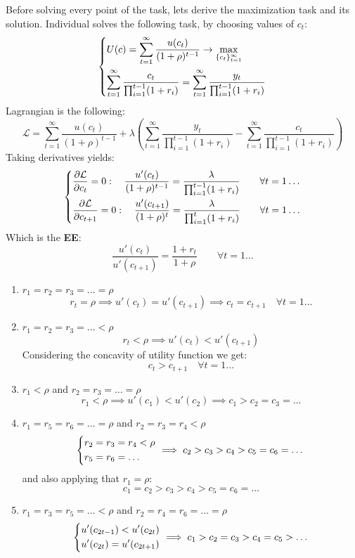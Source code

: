 \documentclass[11pt, oneside]{article}
\renewcommand{\r}{\rho}
\begin{document}
Before solving every point of the task, lets derive the maximization task and its solution. Individual solves the following task, by choosing values of $ c_{t} $:
\[
\begin{dcases}
	U(c) = \sum_{t=1}^{\infty} \frac{u(c_{t})}{(1+\r)^{t-1}} \to \max_{\{c_{t}\}_{t=1}^{\infty}}  \\
	\sum_{t=1}^{\infty}  \frac{c_{t}}{\prod_{i=1}^{t-1} (1+r_{i})} = 	\sum_{t=1}^{\infty}  \frac{y_{t}}{\prod_{i=1}^{t-1} (1+r_{i})}
\end{dcases}
\]
Lagrangian is the following:
\[
	\mathcal{L} = \sum_{t=1}^{\infty} \frac{u(c_{t})}{(1+\r)^{t-1}} + \lambda \left( \sum_{t=1}^{\infty}  \frac{y_{t}}{\prod_{i=1}^{t-1} (1+r_{i})} -  	\sum_{t=1}^{\infty}  \frac{c_{t}}{\prod_{i=1}^{t-1} (1+r_{i})}\right)
\]
Taking derivatives yields:
\[
	\begin{dcases}
		\frac{\partial \mathcal{L}}{\partial c_{t}} = 0: \quad \frac{u'(c_{t})}{(1+\r)^{t-1}} =  \frac{\lambda}{\prod_{i=1}^{t-1} (1+r_{i})} \quad\quad \forall t = 1\dots \\
		\frac{\partial \mathcal{L}}{\partial c_{t+1}} = 0: \quad \frac{u'(c_{t+1})}{(1+\r)^{t}} =  \frac{\lambda}{\prod_{i=1}^{t} (1+r_{i})} \quad\quad \forall t = 1\dots \\
	\end{dcases}
\]
Which is the \textbf{EE}:
\[
	 \frac{u'(c_{t})}{u'(c_{t+1})} = \frac{1+r_{t}}{1 + \r} \quad\quad \forall t = 1\dots
\]
\begin{enumerate}
	\item $ r_{1} = r_{2} = r_{3} = \dots = \rho$ 
		\[
			r_{t} = \r \implies u'(c_{t}) = u'(c_{t+1}) \implies c_{t} = c_{t+1} \quad\forall t = 1\dots
		\]

	\item $ r_{1} = r_{2} = r_{3} = \dots < \rho$
		\[
			r_{t} < \r \implies u'(c_{t}) < u'(c_{t+1}) 
		\]
	Considering the concavity of utility function we get:
		\[
			c_{t} > c_{t+1} \quad\forall t = 1 \dots
		\]
	\item $ r_{1} < \rho  $ and $ r_{2} = r_{3} = \dots = \rho $
		\[
			r_{1} < \r \implies u'(c_{1}) < u'(c_{2}) \implies c_{1} > c_{2} = c_{3} = \dots
		\]
	\item $ r_{1} = r_{5} = r_{6} = \dots = \rho  $ and $ r_{2} = r_{3} = r_{4} < \rho $
		\[
			\begin{dcases}
				r_{2} = r_{3} = r_{4} < \r \\
				r_{5} = r_{6} = \dots
			\end{dcases} \implies c_{2} > c_{3} > c_{4} > c_{5} = c_{6} = \dots
		\]
		and also applying that $ r_{1} = \r $:
		\[
			c_{1} = c_{2} > c_{3} > c_{4} > c_{5} = c_{6} = \dots
		\]
	\item $ r_{1} = r_{3} = r_{5} = \dots < \rho  $ and $ r_{2} = r_{4} = r_{6} = \dots = \rho  $
	\[
	\begin{dcases}
		u'(c_{2t - 1}) < u'(c_{2t}) \\ 
		u'(c_{2t}) = u'(c_{2t+1})
	\end{dcases} \implies c_{1}>c_{2} = c_{3} > c_{4} = c_{5} > \dots
	\]
	
\end{enumerate}
\end{document}
